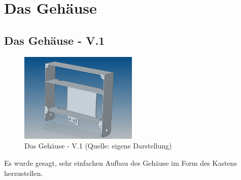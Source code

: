 \newpage
\renewcommand{\autoren}{Valentyn Chepil}
\section{Das Gehäuse}
\subsection{Das Gehäuse - V.1}
\begin{figure}[!h]  %
	\centering\includegraphics[width=0.5\textwidth]{images/gehaeuse-v1.png}
	\caption{Das Gehäuse - V.1 \newline (Quelle: eigene Darstellung)}
	\label{gehaeuse-v1} %
\end{figure}
Es wurde gesagt, sehr einfachen Aufbau des Gehäuse im Form des Kastens herzustellen.

